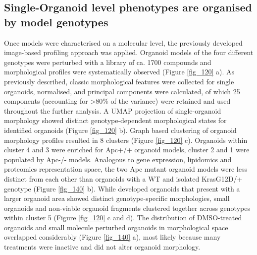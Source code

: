 \begin{flushleft}
\subsection{Single-Organoid level phenotypes are organised by model genotypes}
Once models were characterised on a molecular level, the previously developed image-based profiling approach was applied. Organoid models of the four different genotypes were perturbed with a library of ca. 1700 compounds and morphological profiles were systematically observed (Figure \ref{fig_120} a). As previously described, classic morphological features were collected for single organoids, normalised, and principal components were calculated, of which 25 components (accounting for >80\% of the variance) were retained and used throughout the further analysis. A UMAP projection of single-organoid morphology showed distinct genotype-dependent morphological states for identified organoids (Figure \ref{fig_120} b). Graph based clustering of organoid morphology profiles resulted in 8 clusters (Figure \ref{fig_120} c). Organoids within cluster 4 and 3 were enriched for Apc+/+ organoid models, cluster 2 and 1 were populated by Apc-/- models. Analogous to gene expression, lipidomics and proteomics representation space, the two Apc mutant organoid models were less distinct from each other than organoids with a WT and isolated KrasG12D/+ genotype (Figure \ref{fig_140} b). While developed organoids that present with a larger organoid area showed distinct genotype-specific morphologies, small organoids and non-viable organoid fragments clustered together across genotypes within cluster 5 (Figure \ref{fig_120} c and d). The distribution of DMSO-treated organoids and small molecule perturbed organoids in morphological space overlapped considerably (Figure \ref{fig_140} a), most likely because many treatments were inactive and did not alter organoid morphology. 


\end{flushleft}
